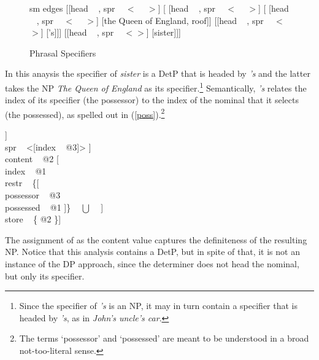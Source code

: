 \documentclass[output=paper]{langsci/langscibook}
\begin{document}
\begin{figure}
	\centering
	\begin{forest}
sm edges
[{[{\sc head} ~   , {\sc spr} ~ $<$ ~ $>$]}
	[{ [{\sc head} ~   , {\sc spr} ~ $<$ ~ $>$]}
		[{ [{\sc head} ~  , {\sc spr} ~ $<$ ~ $>$]} [the Queen of England, roof]]
		[{[{\sc head} ~  , {\sc spr} ~ $<$$>$]} ['s]]]
	[{[{\sc head} ~  , {\sc spr} ~ $<$$>$]} [sister]]]
	\end{forest}
	\caption{\label{cousin} Phrasal Specifiers }  
\end{figure}

In this anaysis the specifier of \emph{sister} is a DetP that is headed by \emph{'s} 
and the latter takes the NP \emph{The Queen of England} as its specifier.\footnote{Since the 
specifier of \emph{'s} is an NP, it may in turn contain a specifier that is headed 
by \emph{'s}, as in \emph{John's uncle's car}.}
Semantically, \emph{'s} relates the index of its specifier (the possessor) to the index
of the nominal that it selects (the possessed), as spelled out in (\ref{poss}).\footnote{The
terms `possessor' and `possessed' are meant to be understood in a broad not-too-literal sense.}     

\begin{exe} 
\ex\label{poss}
\begin{avm}
[cat [head [\type{det}                       \\
            spec [\type{parameter}           \\
                  index ~ @1                  \\
                  restr ~ \avmbox{$\Sigma$} ]] \\
      spr ~ <[index ~ @3]> ]                  \\
 content ~ @2 [                \\
               index ~ @1                     \\
               restr ~ \{[    \\
                          possessor ~ @3      \\
                          possessed ~ @1 ]\} ~ $\bigcup$ ~ \avmbox{$\Sigma$} ] \\
 store ~ \{ @2 \}]  
\end{avm}
\end{exe}

\noindent
The assignment of  as the {\sc content} value captures 
the definiteness of the resulting NP. Notice that this analysis contains a DetP, 
but in spite of that, it is not an instance of the DP approach, since the 
determiner does not head the nominal, but only its specifier. 
\end{document}
